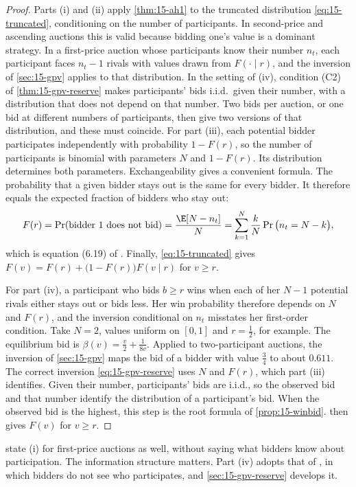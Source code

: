 \begin{proof}
Parts (i) and (ii) apply \cref{thm:15-ah1} to the truncated distribution \eqref{eq:15-truncated}, conditioning on
the number of participants. In second-price and ascending auctions this is valid because bidding one's value is
a dominant strategy. In a first-price auction whose participants know their number $n_t$, each participant faces
$n_t-1$ rivals with values drawn from $F(\cdot\mid r)$, and the inversion of \cref{sec:15-gpv} applies to that
distribution. In the setting of (iv), condition (C2) of \cref{thm:15-gpv-reserve} makes participants' bids
i.i.d.\ given their number, with a distribution that does not depend on that number. Two bids per auction, or one
bid at different numbers of participants, then give two versions of that distribution, and these must coincide.
For part (iii), each potential bidder participates independently with probability $1-F(r)$, so the
number of participants is binomial with parameters $N$ and $1-F(r)$. Its distribution determines both parameters. Exchangeability gives a
convenient formula. The probability that a given bidder stays out is the same for every bidder. It therefore
equals the expected fraction of bidders who stay out:
\[
F(r)=\Pr(\text{bidder 1 does not bid})=\frac{\E[N-n_t]}{N}=\sum_{k=1}^{N}\frac{k}{N}\Pr\big(n_t=N-k\big),
\]
which is equation (6.19) of \citet{AtheyHaile2007}. Finally, \eqref{eq:15-truncated} gives
$F(v)=F(r)+\big(1-F(r)\big)F(v\mid r)$ for $v\ge r$.

For part (iv), a participant who bids $b\ge r$ wins when each of her $N-1$ potential rivals either stays out or bids
less. Her win probability therefore depends on $N$ and $F(r)$, and the inversion conditional on $n_t$ misstates her
first-order condition. Take $N=2$, values uniform on $[0,1]$ and $r=\frac12$, for example. The equilibrium bid is
$\beta(v)=\frac{v}{2}+\frac{1}{8v}$. Applied to two-participant auctions, the inversion of \cref{sec:15-gpv} maps
the bid of a bidder with value $\frac34$ to about $0.611$. The correct inversion \eqref{eq:15-gpv-reserve} uses
$N$ and $F(r)$, which part (iii) identifies. Given their number, participants' bids are i.i.d., so the observed
bid and that number identify the distribution of a participant's bid. When the observed bid is the highest, this
step is the root formula of \cref{prop:15-winbid}.  then gives $F(v)$ for $v\ge r$.
\end{proof}

\citet[Corollary~3]{AtheyHaile2002} state (i) for first-price auctions as well, without saying what bidders know
about participation. The information structure matters. Part (iv) adopts that of \citet{GuerrePerrigneVuong2000},
in which bidders do not see who participates, and \cref{sec:15-gpv-reserve} develops it.

